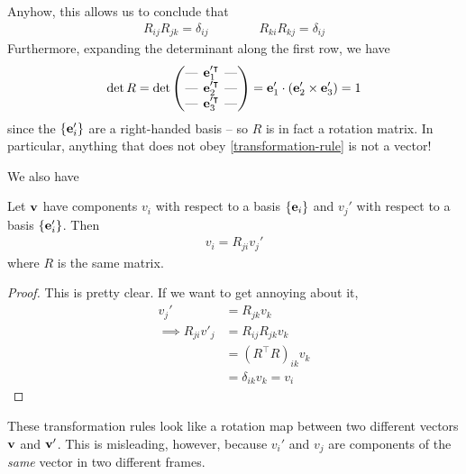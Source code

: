 \documentclass{../template/note}
\begin{document}
    Anyhow, this allows us to conclude that
    \begin{align*}
        R_{ij} R_{jk} = \delta_{ij} \qquad \qquad R_{ki} R_{kj} = \delta_{ij}
    \end{align*}
    Furthermore, expanding the determinant along the first row, we have
    \begin{align*}
        \det R = \det \begin{pmatrix}
            \lln & \V e_1'^\intercal & \rln \\ 
            \lln & \V e_2'^\intercal  & \rln \\ 
            \lln & \V e_3'^\intercal & \rln \\ 
        \end{pmatrix} = \V e_1' \cdot (\V e_2' \times \V e_3') = 1
    \end{align*}
    since the \(\{\V e_i'\}\) are a right-handed basis -- so \(R\) is in fact a rotation matrix. In particular, anything that does not obey \cref{transformation-rule} is not a vector!

    We also have
    \begin{proposition}
        Let \(\V v\) have components \(v_i\) with respect to a basis \(\{\V e_i\}\) and \(v_j'\) with respect to a basis \(\{\V e_i'\}\). Then
        \begin{align*}
            v_i = R_{ji} v_j'
        \end{align*}
        where \(R\) is the same matrix.
    \end{proposition}
    
    \begin{proof}
        This is pretty clear. If we want to get annoying about it,
        \begin{align*}
            v_j' &= R_{jk} v_k \\
            \implies R_{ji} v'_j &= R_{ij} R_{jk} v_k \\
            &= (R^\intercal R)_{ik} v_k \\
            &= \delta_{ik} v_k = v_i
        \end{align*}
    \end{proof}
    
    \begin{remark*}
        These transformation rules look like a rotation map between two different vectors \(\V v\) and \(\V v'\). This is misleading, however, because \(v_i'\) and \(v_j\) are components of the \emph{same} vector in two different frames.
    \end{remark*}
    
\end{document}
